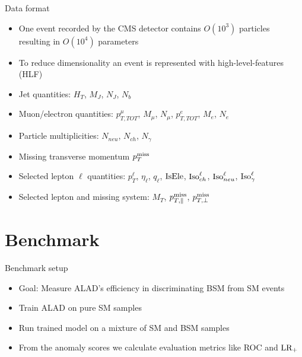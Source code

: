 \documentclass{beamer}
\begin{document}
\begin{frame}{Data format}
  \begin{itemize}
      \item<1-> One event recorded by the CMS detector contains $O(10^3)$ particles resulting in $O(10^4)$ parameters
      \item<2-> To reduce dimensionality an event is represented with high-level-features (HLF)
      \item<3-> Jet quantities: $H_T$, $M_J$, $N_J$, $N_b$
      \item<4-> Muon/electron quantities: $p_{T,TOT}^\mu$, $M_\mu$, $N_\mu$, $p_{T,TOT}^e$, $M_e$, $N_e$
      \item<5-> Particle multiplicities: $N_{neu}$, $N_{ch}$, $N_\gamma$
      \item<6-> Missing transverse momentum $p_T^\textup{miss}$
      \item<7-> Selected lepton $\ell$ quantities: $p_T^\ell$, $\eta_\ell$, $q_\ell$, $\textup{IsEle}$, $\textup{Iso}_{ch}^\ell$, $\textup{Iso}_{neu}^\ell$, $\textup{Iso}_{\gamma}^\ell$
      \item<8-> Selected lepton and missing system: $M_T$, $p_{T,\parallel}^\textup{miss}$, $p_{T,\perp}^\textup{miss}$
  \end{itemize}
\end{frame}

\section{Benchmark}

\begin{frame}{Benchmark setup}
  \begin{itemize}
      \item<1-> Goal: Measure ALAD's efficiency in discriminating BSM from SM events
      \item<2-> Train ALAD on pure SM samples
      \item<3-> Run trained model on a mixture of SM and BSM samples
      \item<4-> From the anomaly scores we calculate evaluation metrics like ROC and $\textup{LR}_+$
  \end{itemize}
\end{frame}
\end{document}
